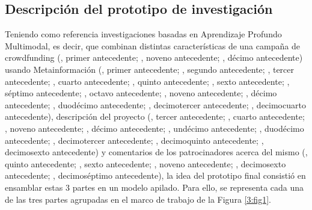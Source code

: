 \subsection{Descripción del prototipo de investigación}
Teniendo como referencia investigaciones basadas en Aprendizaje Profundo Multimodal, es decir, que combinan distintas características de una campaña de crowdfunding (\citeauthor{pr_kamath2018suplearn}, primer antecedente; \citeauthor{pr_jin2019dayssuccess}, noveno antecedente; \citeauthor{pr_cheng2019deeplearning}, décimo antecedente) usando Metainformación (\citeauthor{pr_kamath2018suplearn}, primer antecedente; \citeauthor{pr_beckwith2016predcrowd}, segundo antecedente; \citeauthor{pr_zhou2015projectdesc}, tercer antecedente; \citeauthor{pr_yuan2016textanalytics}, cuarto antecedente; \citeauthor{pr_chen2015predcrowd}, quinto antecedente; \citeauthor{pr_li2016predcrowd}, sexto antecedente; \citeauthor{pr_kaur2017socmedcrowd}, séptimo antecedente; \citeauthor{pr_yu2018deeplearning}, octavo antecedente; \citeauthor{pr_jin2019dayssuccess}, noveno antecedente; \citeauthor{pr_cheng2019deeplearning}, décimo antecedente; \citeauthor{pr_mitra2014phrases}, duodécimo antecedente; \citeauthor{pr_sawhney2016usingLT}, decimotercer antecedente; \citeauthor{pr_chen2013kickpredict}, decimocuarto antecedente), descripción del proyecto (\citeauthor{pr_zhou2015projectdesc}, tercer antecedente; \citeauthor{pr_yuan2016textanalytics}, cuarto antecedente; \citeauthor{pr_jin2019dayssuccess}, noveno antecedente; \citeauthor{pr_cheng2019deeplearning}, décimo antecedente; \citeauthor{pr_chen2019keywords_crowdfunding}, undécimo antecedente; \citeauthor{pr_mitra2014phrases}, duodécimo antecedente; \citeauthor{pr_sawhney2016usingLT}, decimotercer antecedente; \citeauthor{pr_chaichi2019nlp_3dprinting}, decimoquinto antecedente; \citeauthor{pr_lee2018contentDL}, decimosexto antecedente) y comentarios de los patrocinadores acerca del mismo (\citeauthor{pr_chen2015predcrowd}, quinto antecedente; \citeauthor{pr_li2016predcrowd}, sexto antecedente; \citeauthor{pr_jin2019dayssuccess}, noveno antecedente; \citeauthor{pr_lee2018contentDL}, decimosexto antecedente; \citeauthor{pr_shafqat2019topicpredictions}, decimoséptimo antecedente), la idea del prototipo final consistió en ensamblar estas 3 partes en un modelo apilado. Para ello, se representa cada una de las tres partes agrupadas en el marco de trabajo de la Figura \ref{3:fig1}.
